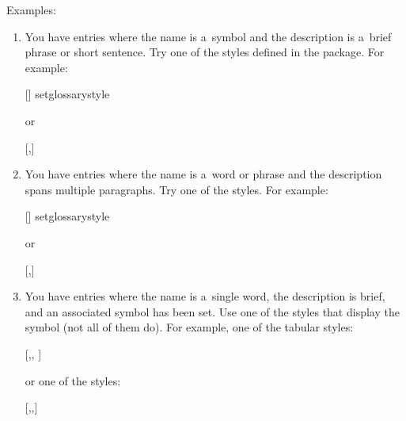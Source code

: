 \documentclass[titlepage=false,oneside,
 fontsize=12pt,captions=tableheading]{scrarticle}
\begin{document}
Examples:
\begin{enumerate}
 \item You have entries where the name is a~symbol and the
 description is a~brief phrase or short sentence. Try one of the 
  styles defined in the  package. For example:
\begin{codebox}
[]
\gls{setglossarystyle}
\end{codebox}
or
\begin{codebox*}
[,]
\end{codebox*}

 \item You have entries where the name is a~word or phrase and the
description spans multiple paragraphs. Try one of the  styles. For
example:
\begin{codebox}
[]
\gls{setglossarystyle}
\end{codebox}
or
\begin{codebox}
[,]
\end{codebox}

 \item You have entries where the name is a~single word, the
  description is brief, and an associated symbol has been set.
  Use one of the styles that display the symbol (not all of them do). 
  For example, one of the tabular styles:
\begin{codebox}
[,,
 ]
\end{codebox}
or one of the  styles:
\begin{codebox}
[,,]
\end{codebox}
\end{enumerate}
\end{document}
